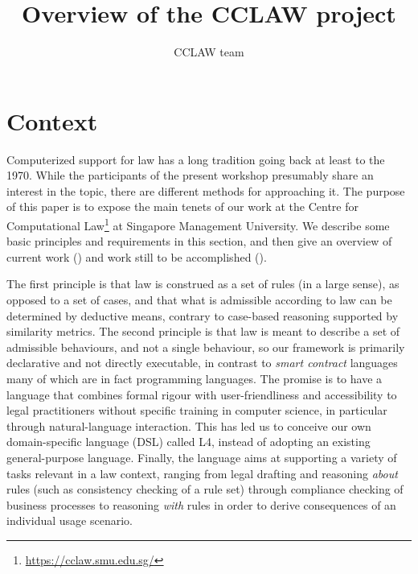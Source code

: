 \documentclass[runningheads]{llncs}
\begin{document}
\title{Overview of the CCLAW project}

\author{CCLAW team
  }
\maketitle

% 



\section{Context}\label{sec:context}

Computerized support for law has a long tradition going back at least to the
1970. While the participants of the present workshop presumably share an
interest in the topic, there are different methods for approaching it. The
purpose of this paper is to expose the main tenets of our work at the Centre
for Computational Law\footnote{\url{https://cclaw.smu.edu.sg/}} at Singapore
Management University. We describe some basic principles and requirements in
this section, and then give an overview of current work
() and work still to be accomplished
().

The first principle is that law is construed as a set of rules (in a large
sense), as opposed to a set of cases, and that what is admissible according to
law can be determined by deductive means, contrary to case-based reasoning
supported by similarity metrics. The second principle is that law is meant to
describe a set of admissible behaviours, and not a single behaviour, so our
framework is primarily declarative and not directly executable, in contrast to
\emph{smart contract} languages many of which are in fact programming
languages. The promise is to have a language that combines formal rigour with
user-friendliness and accessibility to legal practitioners without specific
training in computer science, in particular through natural-language
interaction. This has led us to conceive our own domain-specific language
(DSL) called L4, instead of adopting an existing general-purpose
language. Finally, the language aims at supporting a variety of tasks relevant
in a law context, ranging from legal drafting and reasoning \emph{about} rules
(such as consistency checking of a rule set) through compliance checking of
business processes to reasoning \emph{with} rules in order to derive
consequences of an individual usage scenario.
\end{document}
